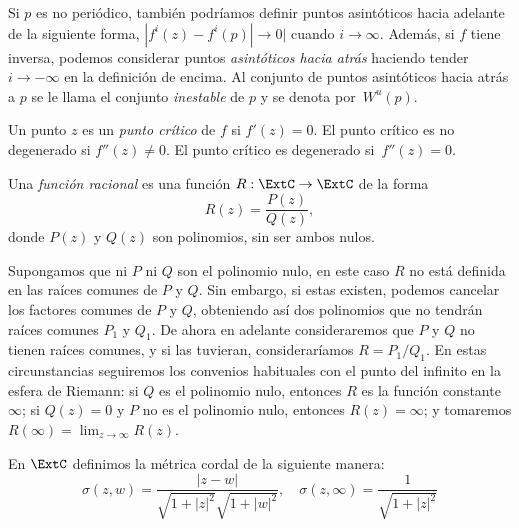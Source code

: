 Si $p$ es no periódico, también podríamos definir puntos asintóticos hacia
adelante de la siguiente forma, $|f^i(z) - f^i(p)| \to 0|$ cuando $i \to
\infty$. Además, si $f$ tiene inversa, podemos considerar puntos
\emph{asintóticos hacia atrás} haciendo tender $i \to -\infty$ en la definición
de encima. Al conjunto de puntos asintóticos hacia atrás a $p$ se le llama el
conjunto \emph{inestable} de $p$ y se denota por~$W^u(p)$.

\begin{definicion}
  Un punto $z$ es un \emph{punto crítico} de $f$ si $f'(z) = 0$. El punto
  crítico es no degenerado si $f''(z) \neq 0$. El punto crítico es degenerado
  si~$f''(z) = 0$.
\end{definicion}

\begin{definicion}
  Una \emph{función racional} es una función $R: \ExtC \to \ExtC$ de la forma
  \begin{equation*}
    R(z) = \frac{P(z)}{Q(z)},
  \end{equation*}
  donde $P(z)$ y $Q(z)$ son polinomios, sin ser ambos nulos.
\end{definicion}

Supongamos que ni $P$ ni $Q$ son el polinomio nulo, en este caso $R$ no está
definida en las raíces comunes de $P$ y $Q$. Sin embargo, si estas existen,
podemos cancelar los factores comunes de $P$ y $Q$, obteniendo así dos
polinomios que no tendrán raíces comunes $P_1$ y $Q_1$. De ahora en adelante
consideraremos que $P$ y $Q$ no tienen raíces comunes, y si las tuvieran,
consideraríamos $R = P_1 / Q_1$. En estas circunstancias seguiremos los
convenios habituales con el punto del infinito en la esfera de Riemann: si $Q$
es el polinomio nulo, entonces $R$ es la función constante $\infty$; si $Q(z) =
0$ y $P$ no es el polinomio nulo, entonces $R(z) = \infty$; y tomaremos
$R(\infty) = \lim_{z \to \infty} R(z)$.

\begin{definicion}
  En $\ExtC$ definimos la métrica cordal de la siguiente manera:
  \begin{equation*}
    \sigma(z, w) = \frac{|z - w|}{\sqrt{1 + |z|^2}\sqrt{1 + |w|^2}}, \quad \sigma(z, \infty) = \frac{1}{\sqrt{1 + |z|^2}}
  \end{equation*}
\end{definicion}

